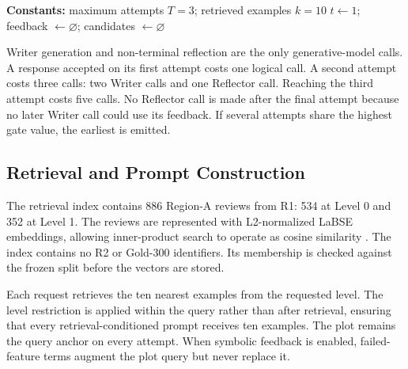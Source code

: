 \begin{algorithm}[htbp]
\caption{Bounded verifier-guided generation}
\label{alg:bounded-generation}
\textbf{Constants:} maximum attempts $T=3$; retrieved examples $k=10$\;
$t\leftarrow1$; feedback $\leftarrow\varnothing$; candidates $\leftarrow\varnothing$\;
\end{algorithm}

Writer generation and non-terminal reflection are the only generative-model calls. A response accepted on its first attempt costs one logical call. A second attempt costs three calls: two Writer calls and one Reflector call. Reaching the third attempt costs five calls. No Reflector call is made after the final attempt because no later Writer call could use its feedback. If several attempts share the highest gate value, the earliest is emitted.

\subsection{Retrieval and Prompt Construction}

The retrieval index contains 886 Region-A reviews from R1: 534 at Level 0 and 352 at Level 1. The reviews are represented with L2-normalized LaBSE embeddings, allowing inner-product search to operate as cosine similarity \cite{b8}. The index contains no R2 or Gold-300 identifiers. Its membership is checked against the frozen split before the vectors are stored.

Each request retrieves the ten nearest examples from the requested level. The level restriction is applied within the query rather than after retrieval, ensuring that every retrieval-conditioned prompt receives ten examples. The plot remains the query anchor on every attempt. When symbolic feedback is enabled, failed-feature terms augment the plot query but never replace it.

